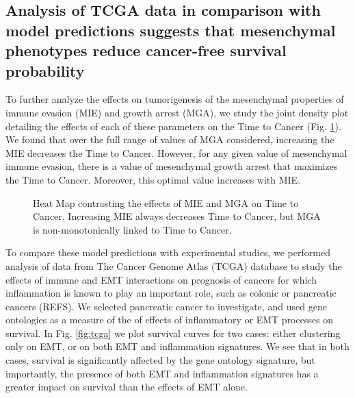 \documentclass[11pt, preprint]{article}
\begin{document}
\subsection{Analysis of TCGA data in comparison with model predictions suggests that mesenchymal phenotypes reduce cancer-free survival probability}\label{tcga}

To further analyze the effects on tumorigenesis of the mesenchymal properties of immune evasion (MIE) and growth arrest (MGA), we study the joint density plot detailing the effects of each of these parameters on the Time to Cancer (Fig. \ref{fig:MIEvsMGA}). We found that over the full range of values of MGA considered, increasing the MIE decreases the Time to Cancer. However, for any given value of mesenchymal immune evasion, there is a value of mesenchymal growth arrest that maximizes the Time to Cancer. Moreover, this optimal value increases with MIE. 

\begin{figure}[H]
\center
{}
\caption{Heat Map contrasting the effects of MIE and MGA on Time to Cancer. Increasing MIE always decreases Time to Cancer, but MGA is non-monotonically linked to Time to Cancer.}
\label{fig:MIEvsMGA}
\end{figure}

To compare these model predictions with experimental studies, we performed analysis of data from The Cancer Genome Atlas (TCGA) database to study the effects of immune and EMT interactions on prognosis of cancers for which inflammation is known to play an important role, such as colonic or pancreatic cancers (REFS). We selected pancreatic cancer to investigate, and used gene ontologies as a measure of the of effects of inflammatory or EMT processes on survival. In Fig. \ref{fig:tcga} we plot survival curves for two cases: either clustering only on EMT, or on both EMT and inflammation signatures. We see that in both cases, survival is significantly affected by the gene ontology signature, but importantly, the presence of both EMT and inflammation signatures has a greater impact on survival than the effects of EMT alone.  
\end{document}
